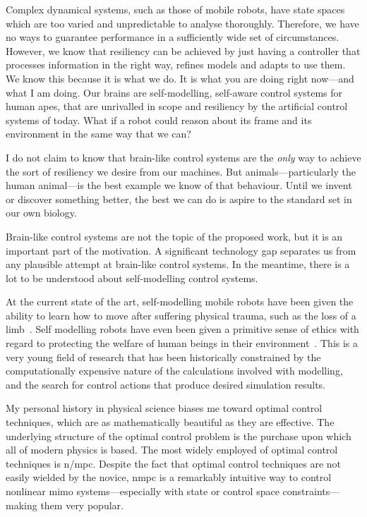 Complex dynamical systems, such as those of mobile robots, have state spaces
which are too varied and unpredictable to analyse thoroughly. Therefore, we have
no ways to guarantee performance in a sufficiently wide set of circumstances.
However, we know that resiliency can be achieved by just having a controller
that processes information in the right way, refines models and adapts to use
them. We know this because it is what we do. It is what you are doing right
now—and what I am doing. Our brains are self-modelling, self-aware control
systems for human apes, that are unrivalled in scope and resiliency by the
artificial control systems of today. What if a robot could reason about its
frame and its environment in the same way that we can?

I do not claim to know that brain-like control systems are the \emph{only} way
to achieve the sort of resiliency we desire from our machines. But
animals—particularly the human animal—is the best example we know of that
behaviour. Until we invent or discover something better, the best we can do is
aspire to the standard set in our own biology.

Brain-like control systems are not the topic of the proposed work, but it is an
important part of the motivation. A significant technology gap separates us from
any plausible attempt at brain-like control systems. In the meantime, there is a
lot to be understood about self-modelling control systems.

At the current state of the art, self-modelling mobile robots have been given
the ability to learn how to move after suffering physical trauma, such as the
loss of a limb~\cite{Bongard2006}. Self modelling robots have even been given a
primitive sense of ethics with regard to protecting the welfare of human beings
in their environment~\cite{Winfield2014}. This is a very young field of research that has been historically
constrained by the computationally expensive nature of the calculations involved
with modelling, and the search for control actions that produce desired
simulation results.

My personal history in physical science biases me toward optimal control
techniques, which are as mathematically beautiful as they are effective. The
underlying structure of the optimal control problem is the purchase upon which
all of modern physics is based. The most widely employed of optimal control
techniques is \ac{n/mpc}. Despite the fact that optimal control techniques are
not easily wielded by the novice, \ac{nmpc} is a remarkably intuitive way to
control nonlinear \ac{mimo} systems—especially with state or control space
constraints—making them very popular.

